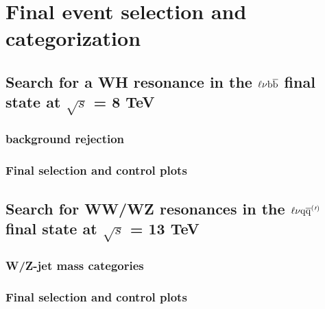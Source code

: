 \chapter{Final event selection and categorization}

\section{Search for a WH resonance in the $\ell\nu{\mathrm{b}\overline{\mathrm{b}}}$ final state at $\sqrt{s}$ = 8 TeV}
\subsection{\ttbar background rejection}
\subsection{Final selection and control plots}

\section{Search for WW/WZ resonances in the $\ell\nu\mathrm{q}\overline{\mathrm{q}}^({}'^){}$ final state at $\sqrt{s}$ = 13 TeV}
\subsection{W/Z-jet mass categories}
\subsection{Final selection and control plots}
